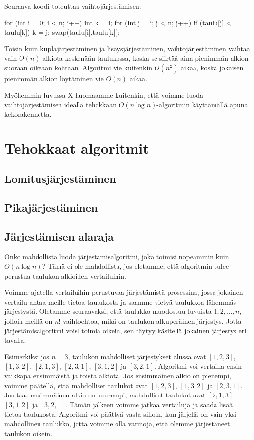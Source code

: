 Seuraava koodi toteuttaa vaihtojärjestämisen:

\begin{code}
for (int i = 0; i < n; i++) {
    int k = i;
    for (int j = i; j < n; j++) {
        if (taulu[j] < taulu[k]) k = j;
    }
    swap(taulu[i],taulu[k]);
}
\end{code}

Toisin kuin kuplajärjestäminen ja lisäysjärjestäminen,
vaihtojärjestäminen vaihtaa vain $O(n)$ alkiota keskenään
taulukossa, koska se siirtää aina pienimmän alkion
suoraan oikeaan kohtaan.
Algoritmi vie kuitenkin $O(n^2)$ aikaa,
koska jokaisen pienimmän alkion löytäminen vie $O(n)$ aikaa.

Myöhemmin luvussa X huomaamme kuitenkin,
että voimme luoda vaihtojärjestämisen idealla tehokkaan
$O(n \log n)$-algoritmin käyttämällä apuna kekorakennetta.

\section{Tehokkaat algoritmit}

\subsection{Lomitusjärjestäminen}

\subsection{Pikajärjestäminen}

\subsection{Järjestämisen alaraja}

Onko mahdollista luoda järjestämisalgoritmi, joka toimisi
nopeammin kuin $O(n \log n)$?
Tämä ei ole mahdollista, jos oletamme, että algoritmin
tulee perustua taulukon alkioiden vertailuihin.

Voimme ajatella vertailuihin perustuvaa järjestämistä
prosessina, jossa jokainen vertailu antaa meille tietoa
taulukosta ja saamme vietyä taulukkoa lähemmäs järjestystä.
Oletamme seuraavaksi, että taulukko muodostuu luvuista
$1,2,\dots,n$, jolloin meillä on $n!$ vaihtoehtoa, mikä
on taulukon alkuperäinen järjestys.
Jotta järjestämisalgoritmi voisi toimia oikein,
sen täytyy käsitellä jokainen järjestys eri tavalla.

Esimerkiksi jos $n=3$, taulukon mahdolliset järjestykset alussa ovat
$[1,2,3]$, $[1,3,2]$, $[2,1,3]$, $[2,3,1]$, $[3,1,2]$ ja $[3,2,1]$.
Algoritmi voi vertailla ensin vaikkapa ensimmäistä ja toista alkiota.
Jos ensimmäinen alkio on pienempi, voimme päätellä,
että mahdolliset taulukot ovat $[1,2,3]$, $[1,3,2]$ ja $[2,3,1]$.
Jos taas ensimmäinen alkio on suurempi,
mahdolliset taulukot ovat $[2,1,3]$, $[3,1,2]$ ja $[3,2,1]$.
Tämän jälkeen voimme jatkaa vertailuja ja saada lisää tietoa taulukosta.
Algoritmi voi päättyä vasta silloin, kun jäljellä on vain yksi
mahdollinen taulukko, jotta voimme olla varmoja, että olemme
järjestäneet taulukon oikein.

